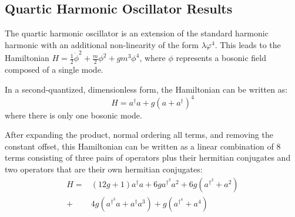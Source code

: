 \subsection{Quartic Harmonic Oscillator Results}
\label{sec:qosc_results}

The quartic harmonic oscillator \cite{PhysRev.184.1231, girguś2024spiralflowquantumquartic, wójcik2012applicationnumericalrenormalizationgroup} is an extension of the standard harmonic harmonic with an additional non-linearity of the form $\lambda \varphi^4$. 
This leads to the Hamiltonian $H = \frac12\dot\phi^2 + \frac{m}{2}\phi^2 + gm^3\phi^4 $, where $\phi$ represents a bosonic field composed of a single mode. 

In a second-quantized, dimensionless form, the Hamiltonian can be written as:
\begin{equation}
    \label{eq:qosc}
    H = a^\dagger a + g\left(a + a^\dagger \right)^4
\end{equation}
where there is only one bosonic mode.

After expanding the product, normal ordering all terms, and removing the constant offset, this Hamiltonian can be written as a linear combination of $8$ terms consisting of three pairs of operators plus their hermitian conjugates and two operators that are their own hermitian conjugates:
\begin{equation}
    \begin{split}
        H = &(12g + 1) a^\dagger a + 6g a^{\dagger^2} a^2 + 6g \left(a^{\dagger^2} + a^2 \right) \\
        + &4g \left(a^{\dagger^3} a + a^\dagger a^3 \right) + g \left(a^{\dagger^4} + a^4 \right)
    \end{split}
\end{equation}

